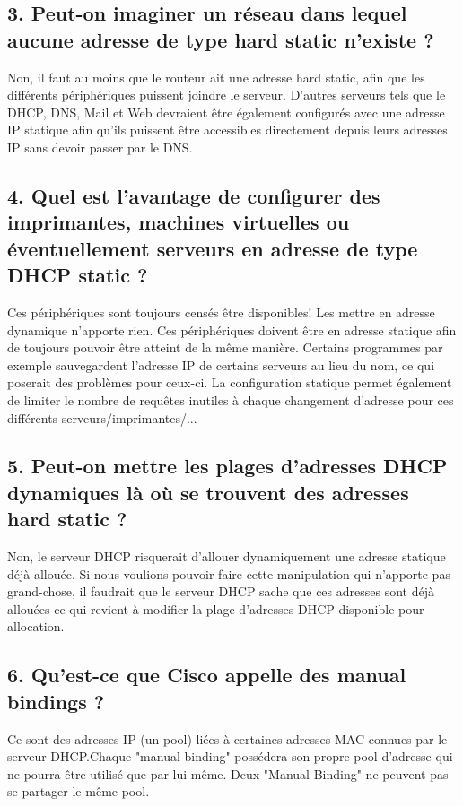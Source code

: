 \documentclass{article}
\begin{document}
\subsection*{3. Peut-on imaginer un réseau dans lequel aucune adresse de type hard static n’existe ?}
Non, il faut au moins que le routeur ait une adresse hard static, afin que les différents périphériques puissent joindre le serveur. D'autres serveurs tels que le DHCP, DNS, Mail et Web devraient être également configurés avec une adresse IP statique afin qu'ils puissent être accessibles directement depuis leurs adresses IP sans devoir passer par le DNS.

\subsection*{4. Quel est l’avantage de configurer des imprimantes, machines virtuelles ou éventuellement serveurs en adresse de type DHCP static ?}
Ces périphériques sont toujours censés être disponibles! Les mettre en adresse dynamique n'apporte rien. Ces périphériques doivent être en adresse statique afin de toujours pouvoir être atteint de la même manière. Certains programmes par exemple sauvegardent l'adresse IP de certains serveurs au lieu du nom, ce qui poserait des problèmes pour ceux-ci. La configuration statique permet également de limiter le nombre de requêtes inutiles à chaque changement d'adresse pour ces différents serveurs/imprimantes/...

\subsection*{5. Peut-on mettre les plages d’adresses DHCP dynamiques là où se trouvent des adresses hard static ?}
Non, le serveur DHCP risquerait d'allouer dynamiquement une adresse statique déjà allouée. Si nous voulions pouvoir faire cette manipulation qui n'apporte pas grand-chose, il faudrait que le serveur DHCP sache que ces adresses sont déjà allouées ce qui revient à modifier la plage d'adresses DHCP disponible pour allocation.

\subsection*{6. Qu’est-ce que Cisco appelle des manual bindings ?}
Ce sont des adresses IP (un pool) liées à certaines adresses MAC connues par le serveur DHCP\cite{manual-bindings}.Chaque "manual binding" possédera son propre pool d'adresse qui ne pourra être utilisé que par lui-même. Deux "Manual Binding" ne peuvent pas se partager le même pool.
\end{document}
